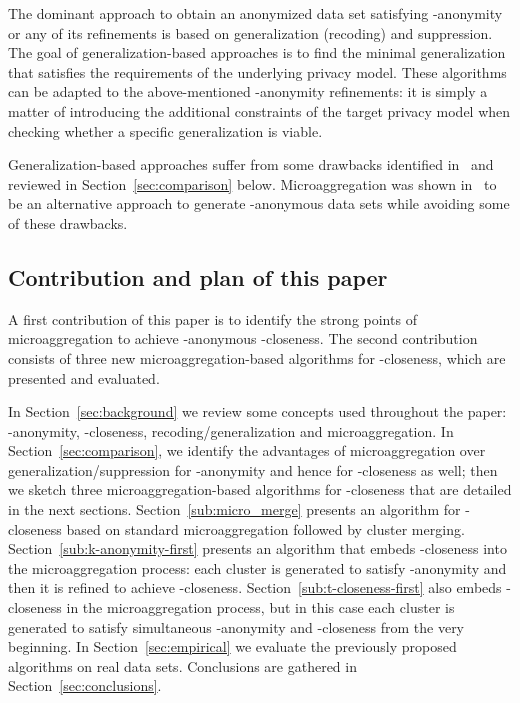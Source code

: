 \documentclass[10pt,journal,compsoc]{IEEEtran}
\theoremstyle{definition}
\theoremstyle{plain}
\begin{document}
The dominant approach to obtain an anonymized
data set satisfying -anonymity or any of its refinements  
is based on generalization (recoding) and suppression. The goal of 
generalization-based approaches is to find the minimal generalization
that satisfies the requirements of the underlying privacy model. 
These algorithms can be adapted to the above-mentioned 
-anonymity refinements: it is simply a matter of introducing
the additional constraints of the target privacy model when checking
whether a specific generalization is viable.

Generalization-based approaches suffer from 
some drawbacks identified in~\cite{Domingo2005Ordinal} and reviewed
in Section~\ref{sec:comparison} below.
Microaggregation was shown in~\cite{Domingo2005Ordinal} 
to be an alternative approach to 
generate -anonymous
data sets while avoiding some of these drawbacks. 


\subsection*{Contribution and plan of this paper}

A first contribution of this paper is to identify the 
strong points of   
microaggregation to achieve -anonymous -closeness.
The second contribution consists of 
three new microaggregation-based algorithms for -closeness, which
are presented and evaluated.
 
In Section~\ref{sec:background}
we review some concepts used throughout the paper: 
-anonymity, -closeness, recoding/generalization and
microaggregation. In Section~\ref{sec:comparison}, we
identify the advantages of microaggregation
over generalization/suppression for -anonymity and hence
for -closeness as well; then we 
sketch three microaggregation-based algorithms for -closeness
that are detailed in the next sections.
Section~\ref{sub:micro_merge} presents an algorithm for 
-closeness based on standard microaggregation followed
by cluster merging. Section~\ref{sub:k-anonymity-first}
presents an algorithm that embeds -closeness into the microaggregation
process: each cluster is generated to satisfy -anonymity and
then it is refined to achieve -closeness.
Section~\ref{sub:t-closeness-first} also embeds -closeness
in the microaggregation process, but in this case each cluster
is generated to satisfy simultaneous -anonymity and -closeness
from the very beginning. 
In Section~\ref{sec:empirical} we evaluate the 
previously proposed algorithms on real data sets. Conclusions
are gathered in Section~\ref{sec:conclusions}.
\end{document}
